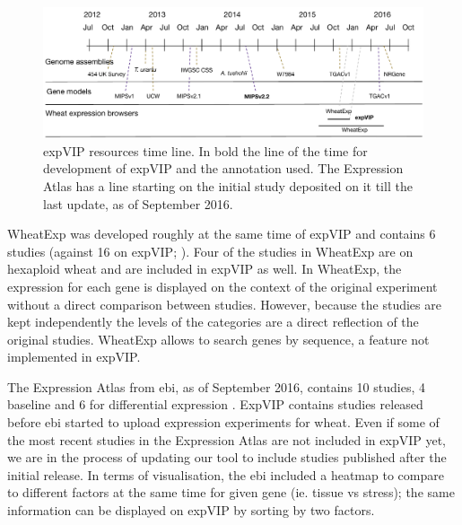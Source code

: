 \begin{figure}
\includegraphics[width=1\textwidth]{expVIP/Figures/Timeline.pdf}
\caption[expVIP resources time line]{expVIP resources time line. In bold the line of the time for development of expVIP and the annotation used. The Expression Atlas has a line starting on the initial study deposited on it till the last update, as of September 2016.}
\label{fig:exp:timeline}
\end{figure}



WheatExp was developed roughly at the same time of expVIP and contains 6 studies (against 16 on expVIP; \citealt{Pearce2015b}). 
Four of the studies in WheatExp are on hexaploid wheat and are included in expVIP as well. 
In WheatExp, the expression for each gene is displayed on the context of the original experiment without a direct comparison between studies. 
However, because the studies are kept independently the levels of the categories are a direct reflection of the original studies. 
WheatExp allows to search genes by sequence, a feature not implemented in expVIP. 

The Expression Atlas from \acrshort{ebi}, as of September 2016, contains 10 studies, 4 baseline and 6 for differential expression \citep{Petryszak2016}. 
ExpVIP contains studies released before \acrshort{ebi} started to upload expression experiments for wheat. 
Even if some of the most recent studies in the Expression Atlas are not included in expVIP yet, we are in the process of updating our tool to include studies published after the initial release.
In terms of visualisation, the \acrshort{ebi} included a heatmap to compare to different factors at the same time for given gene (ie. tissue vs stress); the same information can be displayed on expVIP by sorting by two factors.


